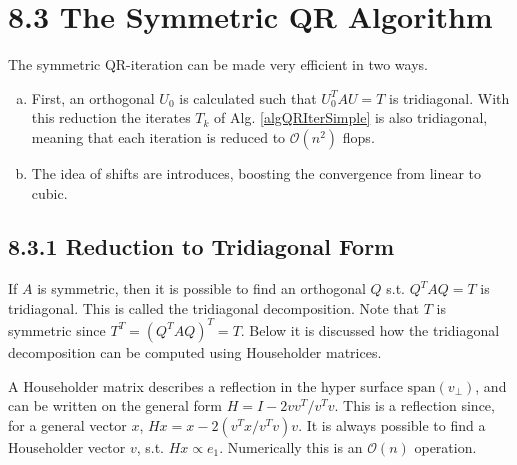 \section*{8.3 The Symmetric QR Algorithm} %

The symmetric QR-iteration can be made very efficient in two ways.
\begin{enumerate}[(a):]
	\item First, an orthogonal $U_0$ is calculated such that $U_0^T A U = T$ is tridiagonal.
	With this reduction the iterates $T_k$ of Alg. \ref{algQRIterSimple} is also tridiagonal,
	meaning that each iteration is reduced to $\mathcal O(n^2)$ flops.
	\item The idea of shifts are introduces, boosting the convergence from linear to cubic.
\end{enumerate} 

\subsection*{8.3.1 Reduction to Tridiagonal Form}%

If $A$ is symmetric, then it is possible to find an orthogonal $Q$ s.t. $Q^TAQ=T$ is tridiagonal.
This is called the tridiagonal decomposition. Note that $T$ is symmetric since
$T^T = (Q^TAQ)^T = T$.
Below it is discussed how the tridiagonal decomposition can be computed using Householder matrices.

A Householder matrix describes a reflection in the hyper surface $\text{span}(v_\bot)$, and can be 
written on the general form $H = I - 2{vv^T}/{v^Tv}$. This is a reflection since, for a general 
vector $x$, $Hx=x - 2({v^Tx}/{v^Tv})v$. It is always possible to find a Householder vector $v$, s.t. 
$Hx\propto e_1$. Numerically this is an $\mathcal O(n)$ operation.

